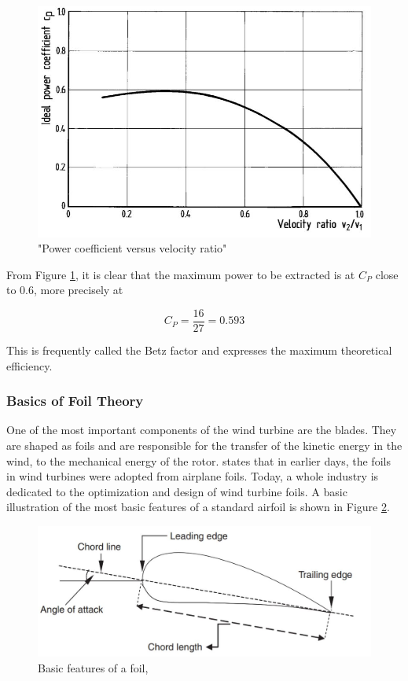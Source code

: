 \begin{figure}[H]
\centering
\includegraphics[scale=0.6]{figures/idealflow}
\caption[$\; \:$Power coefficient versus velocity ratio]{"Power coefficient versus velocity ratio" \cite{Hau2013} }
 \label{fig:idealflow}
\end{figure}

\noindent  From Figure \ref{fig:idealflow}, it is clear that the maximum power to be extracted is at $C_P$ close to 0.6, more precisely at 

 \begin{equation}
    C_P = \frac{16}{27} = 0.593
\end{equation}

\noindent This is frequently called the Betz factor and expresses the maximum theoretical efficiency. 

\subsubsection{Basics of Foil Theory}
One of the most important components of the wind turbine are the blades. They are shaped as foils and are responsible for the transfer of the kinetic energy in the wind, to the mechanical energy of the rotor. \cite{MATHEW2012} states that in earlier days, the foils in wind turbines were adopted from airplane foils. Today, a whole industry is dedicated to the optimization and design of wind turbine foils. A basic illustration of the most basic features of a standard airfoil is shown in Figure \ref{fig:foil}.  

\begin{figure}[H]
\centering
\includegraphics[scale=0.6]{figures/foil}
\caption[$\; \:$Basic features of a foil]{Basic features of a foil, \cite{MATHEW2012} }
 \label{fig:foil}
\end{figure}

